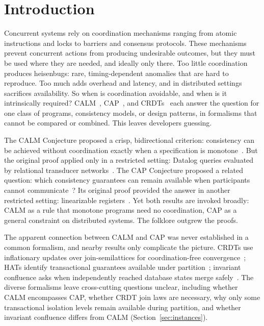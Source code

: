 \section{Introduction}
\label{sec:intro}

Concurrent systems rely on coordination mechanisms ranging from
atomic instructions and locks to barriers and consensus protocols.  These mechanisms
prevent concurrent actions from producing undesirable outcomes, but they must be
used where they are needed, and ideally only there.  Too little coordination
produces heisenbugs: rare, timing-dependent anomalies that are hard to
reproduce.  Too much adds overhead and latency, and in distributed settings
sacrifices availability.  So when is coordination avoidable, and when is it
intrinsically required?  CALM~\cite{ameloot2013relational},
CAP~\cite{gilbert2002cap}, and CRDTs~\cite{shapiro2011crdt} each answer the
question for one class of programs, consistency models, or design patterns, in
formalisms that cannot be compared or combined.  This leaves developers
guessing.

The CALM Conjecture proposed a crisp, bidirectional criterion:
consistency can be achieved without coordination exactly when a specification
is monotone~\cite{hellerstein2010declarative}.  But the original proof applied
only in a restricted setting: Datalog queries evaluated by relational transducer
networks~\cite{ameloot2013relational,hellerstein2020keeping}.  The CAP
Conjecture proposed a related question: which consistency guarantees can remain
available when participants cannot
communicate~\cite{brewer2000towards,brewer2012cap}?  Its original proof
provided the answer in another restricted setting: linearizable
registers~\cite{gilbert2002cap}.  Yet both results are invoked broadly: CALM as a
rule that monotone programs need no coordination, CAP as a general constraint
on distributed systems. The folklore outgrew the proofs.

The apparent connection between CALM and CAP was never established in a common
formalism, and nearby results only complicate the picture. CRDTs use
inflationary updates over join-semilattices for coordination-free
convergence~\cite{shapiro2011crdt}; HATs identify transactional guarantees
available under partition~\cite{bailis2013hat}; invariant confluence asks when
independently reached database states merge
safely~\cite{bailis2014coordination}. The diverse formalisms leave cross-cutting
questions unclear, including whether CALM encompasses CAP, whether CRDT join
laws are necessary, why only some transactional isolation levels remain
available during partition, and whether invariant confluence differs from CALM
(Section~\ref{sec:instances}).

